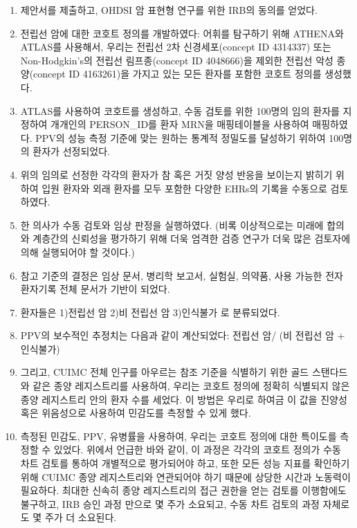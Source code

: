 \documentclass[11pt]{book}
\providecommand{\tightlist}{%
  \setlength{\itemsep}{0pt}\setlength{\parskip}{0pt}}
\theoremstyle{definition}
\theoremstyle{definition}
\theoremstyle{definition}
\theoremstyle{remark}
\begin{document}
\begin{enumerate}
\def\labelenumi{\arabic{enumi}.}
\tightlist
\item
  제안서를 제출하고, OHDSI 암 표현형 연구를 위한 IRB의 동의를 얻었다.
\item
  전립선 암에 대한 코호트 정의를 개발하였다: 어휘를 탐구하기 위해
  ATHENA와 ATLAS를 사용해서, 우리는 전립선 2차 신경세포(concept ID
  4314337) 또는 Non-Hodgkin's의 전립선 림프종(concept ID 4048666)을
  제외한 전립선 악성 종양(concept ID 4163261)을 가지고 있는 모든 환자를
  포함한 코호트 정의를 생성했다.
\item
  ATLAS를 사용하여 코호트를 생성하고, 수동 검토를 위한 100명의 임의
  환자를 지정하여 개개인의 PERSON\_ID를 환자 MRN을 매핑테이블을 사용하여
  매핑하였다. PPV의 성능 측정 기준에 맞는 원하는 통계적 정밀도를
  달성하기 위하여 100명의 환자가 선정되었다.
\item
  위의 임의로 선정한 각각의 환자가 참 혹은 거짓 양성 반응을 보이는지
  밝히기 위하여 입원 환자와 외래 환자를 모두 포함한 다양한 EHRs의 기록을
  수동으로 검토하였다.
\item
  한 의사가 수동 검토와 임상 판정을 실행하였다. (비록 이상적으로는
  미래에 합의와 계층간의 신뢰성을 평가하기 위해 더욱 엄격한 검증 연구가
  더욱 많은 검토자에 의해 실행되어야 할 것이다.)
\item
  참고 기준의 결정은 임상 문서, 병리학 보고서, 실험실, 의약품, 사용
  가능한 전자 환자기록 전체 문서가 기반이 되었다.
\item
  환자들은 1)전립선 암 2)비 전립선 암 3)인식불가 로 분류되었다.
\item
  PPV의 보수적인 추정치는 다음과 같이 계산되었다: 전립선 암/ (비 전립선
  암 + 인식불가)
\item
  그리고, CUIMC 전체 인구를 아우르는 참조 기준을 식별하기 위한 골드
  스탠다드와 같은 종양 레지스트리를 사용하여, 우리는 코호트 정의에
  정확히 식별되지 않은 종양 레지스트리 안의 환자 수를 세었다. 이 방법은
  우리로 하여금 이 값을 진양성 혹은 위음성으로 사용하여 민감도를 측정할
  수 있게 했다.
\item
  측정된 민감도, PPV, 유병률을 사용하여, 우리는 코호트 정의에 대한
  특이도를 측정할 수 있었다. 위에서 언급한 바와 같이, 이 과정은 각각의
  코호트 정의가 수동 차트 검토를 통하여 개별적으로 평가되어야 하고, 또한
  모든 성능 지표를 확인하기 위해 CUIMC 종양 레지스트리와 연관되어야 하기
  때문에 상당한 시간과 노동력이 필요하다. 최대한 신속히 종양
  레지스트리의 접근 권한을 얻는 검토를 이행함에도 불구하고, IRB 승인
  과정 만으로 몇 주가 소요되고, 수동 차트 검토의 과정 자체로도 몇 주가
  더 소요된다.
\end{enumerate}
\end{document}
